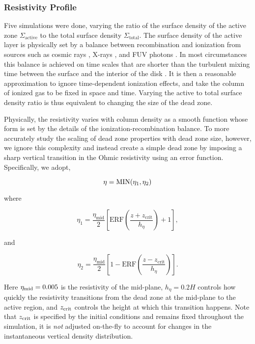 \subsubsection{Resistivity Profile}
Five simulations were done, varying the ratio of the surface density of the active zone $\Sigma_{\text{active}}$ to the total surface density $\Sigma_{\text{total}}$.  The surface density of the active layer is physically set by a balance between recombination and ionization from sources such as cosmic rays \citep{gammie96}, X-rays \citep{igea99}, and FUV photons \citep{perezbecker11}. In most circumstances this balance 
is achieved on time scales that are shorter than the turbulent mixing time between the surface and the interior of the disk  \citep{bai11}. It is then a reasonable approximation to ignore time-dependent ionization effects, and take the column of ionized gas to be fixed in space and time. Varying the active to total surface density ratio is thus equivalent to changing the size of the dead zone. 

Physically, the resistivity varies with column density as a smooth function whose form is set by the details 
of the ionization-recombination balance. To more accurately study the scaling of dead zone properties with dead zone size, however, we ignore this complexity and instead create a simple dead zone by imposing a sharp vertical transition in the Ohmic resistivity using an error function.  Specifically, we adopt,

\begin{equation}
\eta = {\rm MIN}(\eta_1,\eta_2)
\end{equation}

\noindent
where

\begin{equation}
\eta_1 = \frac{\eta_{\text{mid}}}{2}\left[\text{ERF}\left(\frac{z+z_{\text{crit}}}{h_\eta}\right)+1\right],                     
\end{equation}

\noindent
and

\begin{equation}
\eta_2 = \frac{\eta_{\text{mid}}}{2}\left[1-\text{ERF}\left(\frac{z-z_{\text{crit}}}{h_\eta}\right)\right].                    
\end{equation}

\noindent Here $\eta_{\rm mid}=0.005$ is the resistivity of the mid-plane, $h_{\eta}=0.2H$ controls how quickly the resistivity transitions from the dead zone at the mid-plane to the active region, and $z_{\rm crit}$ controls the height at which this transition happens.  Note that $z_{\rm crit}$ is specified by the initial conditions and remains fixed throughout the simulation, it is 
{\em not} adjusted on-the-fly to account for changes in the instantaneous vertical density distribution.

